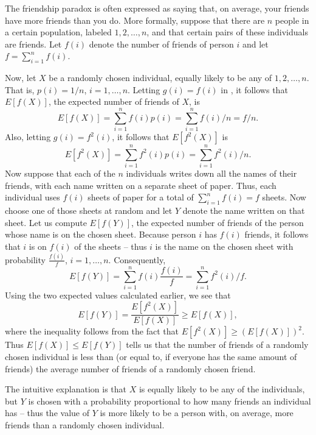 \begin{changebar}
    \begin{example}
        The friendship paradox is often expressed as saying that, on average, your friends have more friends than you do. More formally, suppose that there are $n$ people in a certain population, labeled $1, 2, \dots, n$, and that certain pairs of these individuals are friends. Let $f(i)$ denote the number of friends of person $i$ and let $f = \sum^n_{i = 1} f(i)$.

        Now, let $X$ be a randomly chosen individual, equally likely to be any of $1, 2, \dots, n$. That is, $p(i) = 1/n$, $i = 1, \dots, n$. Letting $g(i) = f(i)$ in , it follows that $E\left[ f(X) \right]$, the expected number of friends of $X$, is \[
            E\left[ f(X) \right] = \sum^n_{i = 1} f(i)p(i) = \sum^n_{i = 1} f(i)/n = f/n.    
        \] Also, letting $g(i) = f^2(i)$, it follows that $E\left[ f^2(X) \right]$ is \[
            E\left[ f^2(X) \right] = \sum^n_{i = 1} f^2(i)p(i) = \sum^n_{i = 1} f^2(i)/n.    
        \] Now suppose that each of the $n$ individuals writes down all the names of their friends, with each name written on a separate sheet of paper. Thus, each individual uses $f(i)$ sheets of paper for a total of $\sum^n_{i = 1} f(i) = f$ sheets. Now choose one of those sheets at random and let $Y$ denote the name written on that sheet. Let us compute $E\left[ f(Y) \right]$, the expected number of friends of the person whose name is on the chosen sheet. Because person $i$ has $f(i)$ friends, it follows that $i$ is on $f(i)$ of the sheets -- thus $i$ is the name on the chosen sheet with probability $\frac{f(i)}{f}$, $i = 1, \dots, n$. Consequently, \[
            E\left[ f(Y) \right] = \sum^n_{i = 1} f(i)\frac{f(i)}{f} = \sum^n_{i = 1} f^2(i)/f.    
        \] Using the two expected values calculated earlier, we see that \[
            E\left[ f(Y) \right] = \frac{E\left[ f^2(X) \right]}{E\left[ f(X) \right]} \geq E\left[ f(X) \right],    
        \] where the inequality follows from the fact that $E\left[ f^2(X) \right] \geq \left(E\left[ f(X) \right]\right)^2$. Thus $E\left[ f(X) \right] \leq E\left[ f(Y) \right]$ tells us that the number of friends of a randomly chosen individual is less than (or equal to, if everyone has the same amount of friends) the average number of friends of a randomly chosen friend.
        
        \begin{remark}
            The intuitive explanation is that $X$ is equally likely to be any of the individuals, but $Y$ is chosen with a probability proportional to how many friends an individual has -- thus the value of $Y$ is more likely to be a person with, on average, more friends than a randomly chosen individual.
        \end{remark}
    \end{example}
\end{changebar}

